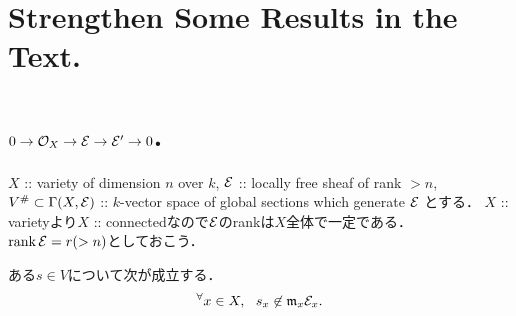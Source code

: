 \documentclass[a4paper]{jsarticle}
\begin{document}
\section{Strengthen Some Results in the Text.} %
    \subsection{}

    \subsection{}

    \subsection{}

    \subsection{}

\section{$0 \to \mathcal{O}_X \to \mathcal{E} \to \mathcal{E}' \to 0$.} %
    $X$ :: variety of dimension $n$ over $k$,
    $\mathcal{E}$ :: locally free sheaf of rank $>n$,
    $V^{\#} \subset \Gamma(X,\mathcal{E})$ ::
    $k$-vector space of global sections which generate $\mathcal{E}$
    とする．
    $X$ :: varietyより$X$ :: connectedなので$\mathcal{E}$のrankは$X$全体で一定である．
    $\operatorname{rank} \mathcal{E}=r (>n)$としておこう．

    \begin{Claim}
        ある$s \in V$について次が成立する．
        \[ {}^{\forall} x \in X,~~ s_x \not \in \mathfrak{m}_x \mathcal{E}_x. \]
    \end{Claim}
\end{document}
